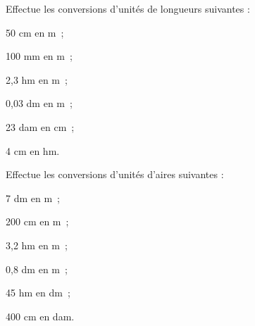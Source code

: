 \begin{methode*1}
\exercice 
Effectue les conversions d'unités de longueurs suivantes :
\begin{colenumerate}{3}
 \item 50 cm en m ;
 \item 100 mm en m ;
 \item 2,3 hm en m ;
 \item 0,03 dm en m ;
 \item 23 dam en cm ;
 \item 4 cm en hm.
 \end{colenumerate}


\exercice 
Effectue les conversions d'unités d'aires suivantes :
\begin{colenumerate}{3}
 \item 7 dm en m ;
 \item 200 cm en m ;
 \item 3,2 hm en m ;
 \item 0,8 dm en m ;
 \item 45 hm en dm ;
 \item 400 cm en dam.
 \end{colenumerate}
 
\end{methode*1}


